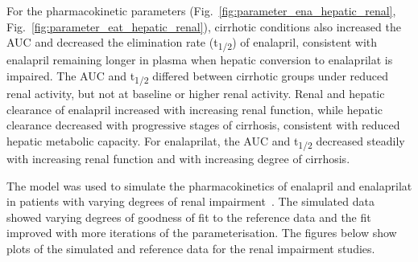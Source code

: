 For the pharmacokinetic parameters (Fig.~\ref{fig:parameter_ena_hepatic_renal}, Fig.~\ref{fig:parameter_eat_hepatic_renal}), cirrhotic conditions also increased the AUC and decreased the elimination rate (t\textsubscript{1/2}) of enalapril, consistent with enalapril remaining longer in plasma when hepatic conversion to enalaprilat is impaired. The AUC and t\textsubscript{1/2} differed between cirrhotic groups under reduced renal activity, but not at baseline or higher renal activity. Renal and hepatic clearance of enalapril increased with increasing renal function, while hepatic clearance decreased with progressive stages of cirrhosis, consistent with reduced hepatic metabolic capacity. For enalaprilat, the AUC and t\textsubscript{1/2} decreased steadily with increasing renal function and with increasing degree of cirrhosis.



The model was used to simulate the pharmacokinetics of enalapril and enalaprilat in patients with varying degrees of renal impairment~\cite{Fruncillo1987, Hockings1986, Kelly1986, Lees1987a, Lowenthal1985, Weisser1992}. The simulated data showed varying degrees of goodness of fit to the reference data and the fit improved with more iterations of the parameterisation. The figures below show plots of the simulated and reference data for the renal impairment studies.

